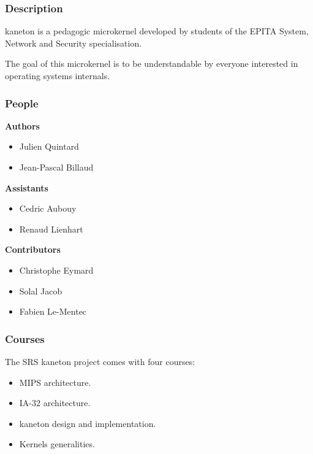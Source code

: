 
\begin{frame}
  \frametitle{Description}

  kaneton is a pedagogic microkernel developed by students of the
  EPITA System, Network and Security specialisation.

  \nl

  The goal of this microkernel is to be understandable by everyone
  interested in operating systems internals.
\end{frame}


\begin{frame}
  \frametitle{People}

  \textbf{Authors}

  \begin{itemize}
    \item
      Julien Quintard
    \item
      Jean-Pascal Billaud
  \end{itemize}

  \nl

  \textbf{Assistants}

  \begin{itemize}
    \item
      Cedric Aubouy
    \item
      Renaud Lienhart
  \end{itemize}

  \nl

  \textbf{Contributors}

  \begin{itemize}
    \item
      Christophe Eymard
    \item
      Solal Jacob
    \item
      Fabien Le-Mentec
  \end{itemize}
\end{frame}


\begin{frame}
  \frametitle{Courses}

  The SRS kaneton project comes with four courses:

  \begin{itemize}[<+->]
    \item
      MIPS architecture.
    \item
      IA-32 architecture.
    \item
      kaneton design and implementation.
    \item
      Kernels generalities.
  \end{itemize}
\end{frame}

